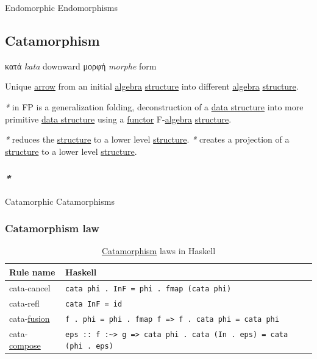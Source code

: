 \documentclass[a4paper,14pt,oneside]{book}
\begin{document}
\label{org9eaa975}Endomorphic
\label{orgf106726}Endomorphisms

\subsection{\label{org11e005e}Catamorphism}
\label{sec:orge62058d}
κατά \emph{kata} downward
μορφή \emph{morphe} form

Unique \hyperref[org74f3926]{arrow} from an initial \hyperref[org19e2593]{algebra} \hyperref[org2f3ef45]{structure} into different \hyperref[org19e2593]{algebra} \hyperref[org2f3ef45]{structure}.

\emph{*} in FP is a generalization folding, deconstruction of a \hyperref[org527bcbb]{data structure} into more primitive \hyperref[org527bcbb]{data structure} using a \hyperref[org61d5270]{functor} F-\hyperref[org19e2593]{algebra} \hyperref[org2f3ef45]{structure}. 

\emph{*} reduces the \hyperref[org2f3ef45]{structure} to a lower level \hyperref[org2f3ef45]{structure}.
\emph{*} creates a projection of a \hyperref[org2f3ef45]{structure} to a lower level \hyperref[org2f3ef45]{structure}.

\subsubsection{\emph{*}}
\label{sec:org36b03f4}

\label{org2016c22}Catamorphic
\label{org815428e}Catamorphisms

\subsubsection{\label{org0144725}Catamorphism law}
\label{sec:org528f4da}
\begin{table}[htbp]
\caption{\label{tab--catamorphism-law-in-haskell}\hyperref[org11e005e]{Catamorphism} laws in Haskell}
\centering
\begin{tabu} spread \linewidth {ll}
\toprule
Rule name & Haskell\\
\midrule
cata-cancel & \texttt{cata phi . InF = phi . fmap (cata phi)}\\
cata-refl & \texttt{cata InF = id}\\
cata-\hyperref[org587fb9f]{fusion} & \texttt{f . phi = phi . fmap f => f . cata phi = cata phi}\\
cata-\hyperref[org442d3d5]{compose} & \texttt{eps :: f :\textasciitilde{}> g => cata phi . cata (In . eps) = cata (phi . eps)}\\
\bottomrule
\end{tabu}
\end{table}
\end{document}
